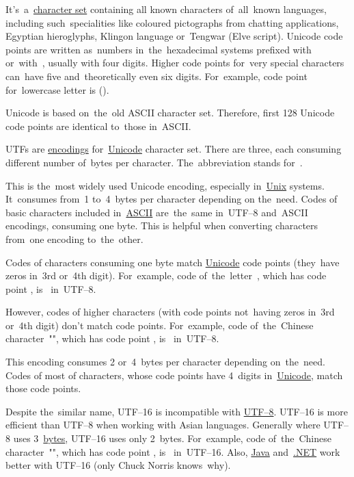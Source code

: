 \label{unicode}
It's~a~\hyperref[charactersetencoding]{character set} containing all known characters of~all~known languages, including such~specialities like coloured pictographs from chatting applications, Egyptian hieroglyphs, Klingon language or~Tengwar (Elve script).
Unicode code points are written as~numbers in~the~hexadecimal systems prefixed \mbox{with } \mbox{or with }, usually with four digits.
Higher code points for~very special characters can~have five and~theoretically even six digits.
For~example, code point for~lowercase letter  is  \mbox().

Unicode is based on~the~old ASCII character set.
Therefore, first 128 Unicode code points are identical to~those in~ASCII.

\label{utf}
UTFs are \hyperref[charactersetencoding]{encodings} for~\hyperref[unicode]{Unicode} character set.
There are three, each consuming different number of~bytes per character.
The~abbreviation stands for~.

\label{utf8}
This is the~most widely used Unicode encoding, especially in~\hyperref[unixlinux]{Unix} systems.
It~consumes from~1 to~4~bytes per character depending on the~need.
Codes of basic characters included in~\hyperref[ascii]{ASCII} are~the~same \mbox{in UTF--8} and~ASCII encodings, consuming one byte.
This is helpful when converting characters from~one encoding to~the~other.

Codes of characters consuming one byte match \hyperref[unicode]{Unicode} code points (they~have zeros in~3rd or~4th digit).
For~example, code of~the~letter~, which has code point , is~ \mbox{in UTF--8}.

However, codes of higher characters (with code points not~having zeros in~3rd or~4th digit) don't match code points.
For~example, code of~the~Chinese \mbox{character ""}, which has code point , \mbox{is~} \mbox{in UTF--8}.

\label{utf16}
This encoding consumes 2 or~4~bytes per character depending on~the~need.
Codes of most of characters, whose code points have 4~digits in~\hyperref[unicode]{Unicode}, match those code points.

Despite the~similar name, \mbox{UTF--16} is incompatible with \hyperref[utf8]{\mbox{UTF--8}}.
\mbox{UTF--16} is more efficient than \mbox{UTF--8} when working with Asian languages.
Generally where \mbox{UTF--8} uses 3~\hyperref[bitsandbytes]{bytes}, \mbox{UTF--16} uses only 2~bytes.
For~example, code of~the~Chinese \mbox{character ""}, which has code point , \mbox{is~} \mbox{in UTF--16}.
Also, \hyperref[java]{Java} and~\hyperref[dotnet]{.NET} work better with \mbox{UTF--16} (only Chuck Norris knows~why).
\newpage

